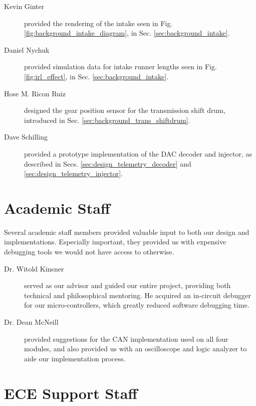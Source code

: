 \begin{description}

\item[Kevin Ginter] provided the rendering of the intake seen in Fig. \ref{fig:background_intake_diagram}, in Sec. \ref{sec:background_intake}.

\item[Daniel Nychuk] provided simulation data for intake runner lengths seen in Fig. \ref{fig:irl_effect}, in Sec. \ref{sec:background_intake}. 

\item[Hose M. Ricon Ruiz] designed the gear position sensor for the transmission shift drum, introduced in Sec. \ref{sec:background_trans_shiftdrum}.

\item[Dave Schilling] provided a prototype implementation of the DAC decoder and injector, as described in Secs. \ref{sec:design_telemetry_decoder} and \ref {sec:design_telemetry_injector}.

\end{description}

\section*{Academic Staff}

Several academic staff members provided valuable input to both our design and implementations. Especially important, they provided us with expensive debugging tools we would not have access to otherwise.

\begin{description}

\item[Dr. Witold Kinsner] served as our advisor and guided our entire project, providing both technical and philosophical mentoring. He acquired an in-circuit debugger for our micro-controllers, which greatly reduced software debugging time.

\item[Dr. Dean McNeill] provided suggestions for the CAN implementation used on all four modules, and also provided us with an oscilloscope and logic analyzer to aide our implementation process.

\end{description}

\section*{ECE Support Staff}

